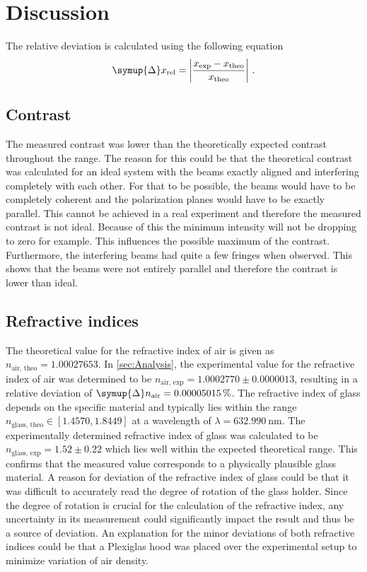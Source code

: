 \section{Discussion}
\label{sec:Discussion}
The relative deviation is calculated using the following equation
\begin{equation*}
    \symup{\Delta} x_{\text{rel}} = \left| \frac{x_{\text{exp}} - x_{{\text{theo}}}}{x_{{\text{theo}}}}\right|\,.
\end{equation*}
\subsection{Contrast}
The measured contrast was lower than the theoretically expected contrast throughout the range. The reason for this could be 
that the theoretical contrast was calculated for an ideal system with the beams exactly aligned and interfering completely with each other. 
For that to be possible, the beams would have to be completely coherent and the polarization planes would have to be exactly parallel.
This cannot be achieved in 
a real experiment and therefore the measured contrast is not ideal.  Because of this the minimum intensity will not be dropping to zero for example. This influences the possible maximum of the contrast. Furthermore, the interfering beams had quite a few fringes when observed. This shows that the beams 
were not entirely parallel and therefore the contrast is lower than ideal.

\subsection{Refractive indices}
The theoretical value for the refractive index of air is given as $n_{\text{air, theo}}=1.00027653$. 
In \autoref{sec:Analysis}, the experimental value for the refractive index of air was determined to be 
$n_{\text{air, exp}} = 1.0002770\pm0.0000013$, resulting in a relative deviation of $\symup{\Delta}n_{\text{air}} = 0.00005015\,\%$. 
The refractive index of 
glass depends on the specific material and typically lies within the range $n_{\text{glass, theo}}\in [1.4570, 1.8449]$ at a 
wavelength of $\lambda = \SI{632.990}{\nano\meter}$. 
The experimentally determined refractive index of glass was calculated to be $n_{\text{glass, exp}} = 1.52\pm0.22$ which lies 
well within the expected theoretical range. 
This confirms that the measured value corresponds to a physically plausible glass material.
A reason for deviation of the refractive index of glass could be that it was difficult to accurately read the degree of rotation 
of the glass holder. 
Since the degree of rotation is crucial for the calculation of the refractive index, any uncertainty in its measurement could significantly impact the result and thus be a source of deviation.
An explanation for the minor deviations of both refractive indices could be that a Plexiglas hood was placed over the 
experimental setup to minimize 
variation of air density.